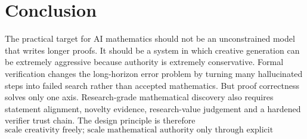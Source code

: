 \section{Conclusion}

The practical target for AI mathematics should not be an unconstrained model that writes longer proofs. It should be a system in which creative generation can be extremely aggressive because authority is extremely conservative. Formal verification changes the long-horizon error problem by turning many hallucinated steps into failed search rather than accepted mathematics. But proof correctness solves only one axis. Research-grade mathematical discovery also requires statement alignment, novelty evidence, research-value judgement and a hardened verifier trust chain. The design principle is therefore
\[
\boxed{\text{scale creativity freely; scale mathematical authority only through explicit assurance.}}
\]
